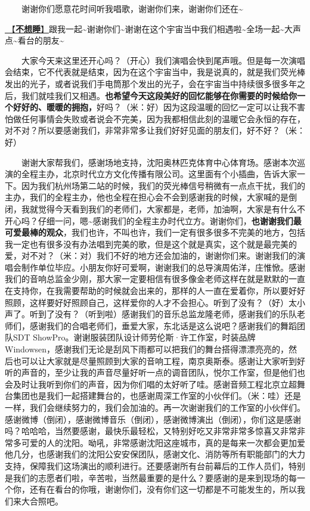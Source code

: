 \documentclass[]{ctexbook}
\begin{document}
  谢谢你们愿意花时间听我唱歌，谢谢你们来，谢谢你们还在\textasciitilde{}

\hyperref[keep-playing]{🎵【\textbf{不想睡}】}跟我一起\textasciitilde 谢谢你们\textasciitilde 谢谢在这个宇宙当中我们相遇啦\textasciitilde 全场一起\textasciitilde 大声点\textasciitilde 看台的朋友\textasciitilde{}

  大家今天来这里还开心吗？（开心）我们演唱会快到尾声哦。但是每一次演唱会结束，它不代表就是结束，因为在这个宇宙当中，我是说真的，就是我们荧光棒发出的光子，或者说我们手电筒那个发出的光子，会在宇宙当中持续很多很多年之后，我们就哇我们又相遇。\textbf{也希望今天这段美好的回忆能够在你需要的时候给你一个好好的、暖暖的拥抱，}好吗？（米：好）因为这段温暖的回忆一定可以让我不害怕做任何事情会失败或者说会不完美，因为我都相信此刻的温暖它会永恒的存在，对不对？所以要感谢我们，非常非常多让我们好好见面的朋友们，好不好？（米：好）

  谢谢大家帮我们，感谢场地支持，沈阳奥林匹克体育中心体育场。感谢本次巡演的全程主办，北京时代立方文化传播有限公司。这里面有个小插曲，告诉大家一下。因为我们杭州场第二站的时候，我们的荧光棒信号稍微有一点点干扰，我们的主办，我们的全程主办，他也全程在担心会不会到感谢我的时候，大家喊的是倒闭，我就觉得今天看到我们的老师们，大家都是，老师，加油啊，大家是有什么不开心吗？仔细一问，嗯\textasciitilde 感谢我们的全程主办时代立方。谢谢你们，\textbf{也谢谢我们最可爱最棒的观众}，我们也许，不叫也许，我们一定有很多很多不完美的地方，包括我一定也有很多没有办法唱到完美的歌，但是这个就是真实，这个就是最完美的爱，对不对？（米：对）我们不好的地方还会加油的，谢谢你们来。谢谢我们的演唱会制作单位毕应。小朋友你好可爱啊，谢谢我们的总导演周佑洋，庄惟惞。感谢我们的音响总监金少刚，那大家一定要相信有很多像金老师这样在就是默默的一直在支持你，在我需要帮助的时候就会出来的，那样的人一直在爱着你，所以要好好照顾，这样要好好照顾自己，这样爱你的人才不会担心。听到了没有？（好）太小声了。听到了没有？（听到啦）感谢我们的音乐总监龙隆老师，感谢我们的乐队老师们，感谢我们的合唱老师们，垂爱大家，东北话是这么说吧？感谢我们的舞蹈团队SDT ShowPro。谢谢服装团队设计师劳伦斯·许工作室，时装品牌Windowsen，感谢我们无论是刮风下雨都可以把我们的舞台搭得漂漂亮亮的，然后也可以让大家就是尽量照顾到大家的音响工程，南京奥斯泰。感谢让大家听到好听的声音的，至少让我的声音尽量好听一点的调音团队，悦尔工作室，但是他们也会及时让我听到你们的声音，因为你们唱的太好听了哇。感谢音频工程北京立超舞台集团也是我们一起搭建舞台的，也感谢周深工作室的小伙伴们。（米：哇）还是一样，我们会继续努力的，我们会加油的。再一次谢谢我们的工作室的小伙伴们。感谢微博（倒闭），感谢微博音乐（倒闭），感谢微博演出（倒闭），你们这是感谢吗？哈哈哈，当然要感谢，最快乐最轻松，又特别好吃又非常非常多惊喜又非常非常多可爱的人的沈阳。呦吼，非常感谢沈阳这座城市，真的是每来一次都会更加爱他几分，也感谢我们的沈阳公安安保团队，感谢文化、消防等所有职能部门的大力支持，保障我们这场演出的顺利进行。还要感谢所有台前幕后的工作人员们，特别是我们的志愿者们啦，辛苦啦，当然最重要的是什么？要感谢的是来到现场的每一个你，还有在看台的你哦，谢谢你们，没有你们这一切都是不可能发生的，所以我们来大合照吧。
\end{document}
